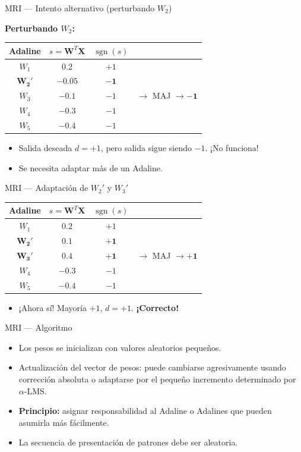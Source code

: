 \documentclass[aspectratio=169,utf8,spanish]{beamer}
\DeclareMathOperator{\sgn}{sgn}
\begin{document}
\begin{frame}{MRI — Intento alternativo (perturbando $W_2$)}
  \begin{center}
    \textbf{Perturbando $W_2$:}
    \begin{tabular}{c|c|c|c}
      Adaline & $s = \mathbf{W}^T\mathbf{X}$ & $\sgn(s)$ & \\
      \hline
      $W_1$ & $0.2$ & $+1$ & \\
      $\mathbf{W_2'}$ & $\mathbf{-0.05}$ & $\mathbf{-1}$ & \\
      $W_3$ & $-0.1$ & $-1$ & $\to$ MAJ $\to \mathbf{-1}$ \\
      $W_4$ & $-0.3$ & $-1$ & \\
      $W_5$ & $-0.4$ & $-1$ & \\
    \end{tabular}
  \end{center}
  \begin{itemize}
    \item Salida deseada $d = +1$, pero salida sigue siendo $-1$. ¡No funciona!
    \item Se necesita adaptar más de un Adaline.
  \end{itemize}
\end{frame}

\begin{frame}{MRI — Adaptación de $W_2'$ y $W_3'$}
  \begin{center}
    \begin{tabular}{c|c|c|c}
      Adaline & $s = \mathbf{W}^T\mathbf{X}$ & $\sgn(s)$ & \\
      \hline
      $W_1$ & $0.2$ & $+1$ & \\
      $\mathbf{W_2'}$ & $\mathbf{0.1}$ & $\mathbf{+1}$ & \\
      $\mathbf{W_3'}$ & $\mathbf{0.4}$ & $\mathbf{+1}$ & $\to$ MAJ $\to \mathbf{+1}$ \\
      $W_4$ & $-0.3$ & $-1$ & \\
      $W_5$ & $-0.4$ & $-1$ & \\
    \end{tabular}
  \end{center}
  \begin{itemize}
    \item ¡Ahora sí! Mayoría $+1$, $d = +1$. \textbf{¡Correcto!}
  \end{itemize}
\end{frame}

\begin{frame}{MRI — Algoritmo}
  \begin{itemize}
    \item Los pesos se inicializan con valores aleatorios pequeños.
    \item Actualización del vector de pesos: puede cambiarse agresivamente usando corrección absoluta o adaptarse por el pequeño incremento determinado por $\alpha$-LMS.
    \item \textbf{Principio:} asignar responsabilidad al Adaline o Adalines que pueden asumirla más fácilmente.
    \item La secuencia de presentación de patrones debe ser aleatoria.
  \end{itemize}
\end{frame}
\end{document}
